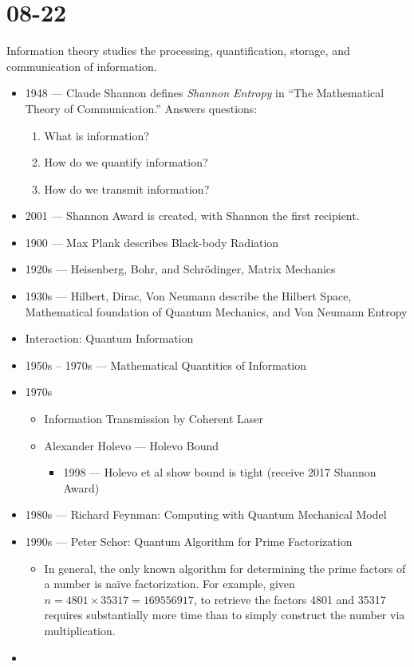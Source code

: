 \section{08-22}
Information theory studies the processing, quantification, storage, and communication
of information.
\begin{itemize}
    \item 1948 --- Claude Shannon defines \emph{Shannon Entropy} in ``The Mathematical
          Theory of Communication.'' Answers questions:
          \begin{enumerate}
              \item What is information?
              \item How do we quantify information?
              \item How do we transmit information?
          \end{enumerate}
    \item 2001 --- Shannon Award is created, with Shannon the first recipient.
    \item 1900 --- Max Plank describes Black-body Radiation
    \item 1920s --- Heisenberg, Bohr, and Schrödinger, Matrix Mechanics
    \item 1930s --- Hilbert, Dirac, Von Neumann describe the Hilbert Space, Mathematical
          foundation of Quantum Mechanics, and Von Neumann Entropy
    \item Interaction: Quantum Information
    \item 1950s -- 1970s --- Mathematical Quantities of Information
    \item 1970s
          \begin{itemize}
              \item Information Transmission by Coherent Laser
              \item Alexander Holevo --- Holevo Bound
                    \begin{itemize}
                        \item 1998 --- Holevo et al show bound is tight (receive 2017 Shannon Award)
                    \end{itemize}
          \end{itemize}
    \item 1980s --- Richard Feynman: Computing with Quantum Mechanical Model
    \item 1990s --- Peter Schor: Quantum Algorithm for Prime Factorization
          \begin{itemize}
              \item In general, the only known algorithm for determining the prime factors
                    of a number is naïve factorization. For example, given
                    $n = 4801 \times 35317 = 169556917$, to retrieve the factors
                    4801 and 35317 requires substantially more time than to simply
                    construct the number via multiplication.
          \end{itemize}
    \item
\end{itemize}